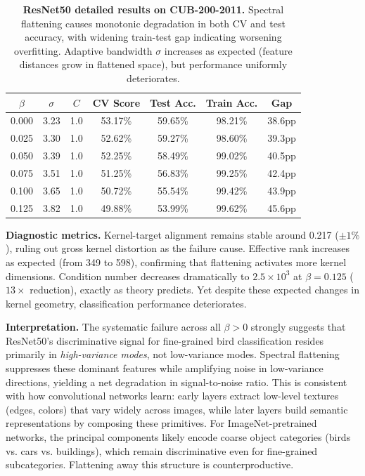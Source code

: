 \documentclass[11pt]{article}
\begin{document}
\begin{table}[h]
\centering
\caption{\textbf{ResNet50 detailed results on CUB-200-2011.} Spectral flattening causes monotonic degradation in both CV and test accuracy, with widening train-test gap indicating worsening overfitting. Adaptive bandwidth $\sigma$ increases as expected (feature distances grow in flattened space), but performance uniformly deteriorates.}
\label{tab:resnet50_detail}
\begin{tabular}{ccccccc}
\toprule
$\beta$ & $\sigma$ & $C$ & CV Score & Test Acc. & Train Acc. & Gap \\
\midrule
0.000 & 3.23 & 1.0 & 53.17\% & 59.65\% & 98.21\% & 38.6pp \\
0.025 & 3.30 & 1.0 & 52.62\% & 59.27\% & 98.60\% & 39.3pp \\
0.050 & 3.39 & 1.0 & 52.25\% & 58.49\% & 99.02\% & 40.5pp \\
0.075 & 3.51 & 1.0 & 51.25\% & 56.83\% & 99.25\% & 42.4pp \\
0.100 & 3.65 & 1.0 & 50.72\% & 55.54\% & 99.42\% & 43.9pp \\
0.125 & 3.82 & 1.0 & 49.88\% & 53.99\% & 99.62\% & 45.6pp \\
\bottomrule
\end{tabular}
\end{table}

\textbf{Diagnostic metrics.} Kernel-target alignment remains stable around 0.217 ($\pm 1\%$), ruling out gross kernel distortion as the failure cause. Effective rank increases as expected (from 349 to 598), confirming that flattening activates more kernel dimensions. Condition number decreases dramatically to $2.5 \times 10^3$ at $\beta=0.125$ ($13\times$ reduction), exactly as theory predicts. Yet despite these expected changes in kernel geometry, classification performance deteriorates.

\textbf{Interpretation.} The systematic failure across all $\beta > 0$ strongly suggests that ResNet50's discriminative signal for fine-grained bird classification resides primarily in \emph{high-variance modes}, not low-variance modes. Spectral flattening suppresses these dominant features while amplifying noise in low-variance directions, yielding a net degradation in signal-to-noise ratio. This is consistent with how convolutional networks learn: early layers extract low-level textures (edges, colors) that vary widely across images, while later layers build semantic representations by composing these primitives. For ImageNet-pretrained networks, the principal components likely encode coarse object categories (birds vs. cars vs. buildings), which remain discriminative even for fine-grained subcategories. Flattening away this structure is counterproductive.
\end{document}
